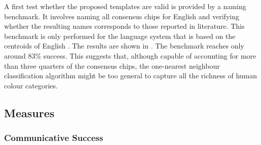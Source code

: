 A first test whether the proposed templates are valid is provided by a
naming benchmark. It
involves naming all consensus chips for English
\citep{sturges95location} and verifying whether the resulting names
corresponds to those reported in literature. This benchmark is only
performed for the language system that is based on the centroids of
English \citep{sturges95location}. The results are shown in . The benchmark reaches only around 83\%
success.  This suggests that, although capable of accounting for more
than three quarters of the consensus chips, the one-nearest neighbour
classification algorithm might be too general to capture all the
richness of human colour categories.

\begin{table}[htbp]
  \centering
  \normalsize
  \caption[Naming benchmark for English basic colour categories]{Number of correctly
    named consensus samples broken down by category: white (\textsc{we}), grey
    (\textsc{gy}), black (\textsc{bk}), green (\textsc{gn}), yellow (\textsc{yw}), blue (\textsc{bl}), red (\textsc{rd}), purple (\textsc{pu}), brown (\textsc{br}), orange (\textsc{or}) and pink (\textsc{pk}). The total
    number of consensus chips is shown on top.}
  \label{t:bcs-naming-benchmark}
\end{table}

\subsection{Measures}

\subsubsection{Communicative Success}

